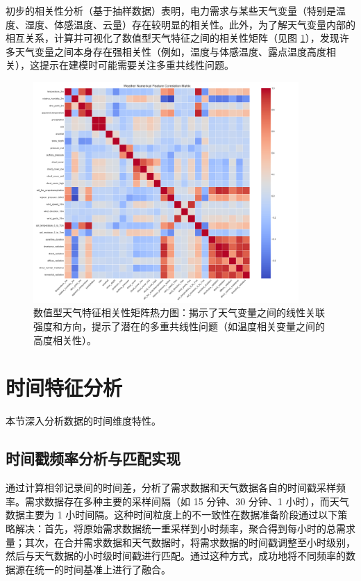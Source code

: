 \documentclass{article} %
\begin{document}
初步的相关性分析（基于抽样数据）表明，电力需求与某些天气变量（特别是温度、湿度、体感温度、云量）存在较明显的相关性。此外，为了解天气变量内部的相互关系，计算并可视化了数值型天气特征之间的相关性矩阵（见图 \ref{fig:weather_correlation}），发现许多天气变量之间本身存在强相关性（例如，温度与体感温度、露点温度高度相关），这提示在建模时可能需要关注多重共线性问题。

\begin{figure}[H]
    \centering
    \includegraphics[width=0.9\textwidth]{../plots/weather_correlation_matrix.png}
    \caption{数值型天气特征相关性矩阵热力图：揭示了天气变量之间的线性关联强度和方向，提示了潜在的多重共线性问题（如温度相关变量之间的高度相关性）。} %
    \label{fig:weather_correlation}
\end{figure}

\section{时间特征分析}
\label{sec:time_analysis}

本节深入分析数据的时间维度特性。

\subsection{时间戳频率分析与匹配实现}
\label{sec:frequency_matching}

通过计算相邻记录间的时间差，分析了需求数据和天气数据各自的时间戳采样频率。需求数据存在多种主要的采样间隔（如 15 分钟、30 分钟、1 小时），而天气数据主要为 1 小时间隔。这种时间粒度上的不一致性在数据准备阶段通过以下策略解决：首先，将原始需求数据统一重采样到小时频率，聚合得到每小时的总需求量；其次，在合并需求数据和天气数据时，将需求数据的时间戳调整至小时级别，然后与天气数据的小时级时间戳进行匹配。通过这种方式，成功地将不同频率的数据源在统一的时间基准上进行了融合。
\end{document}
